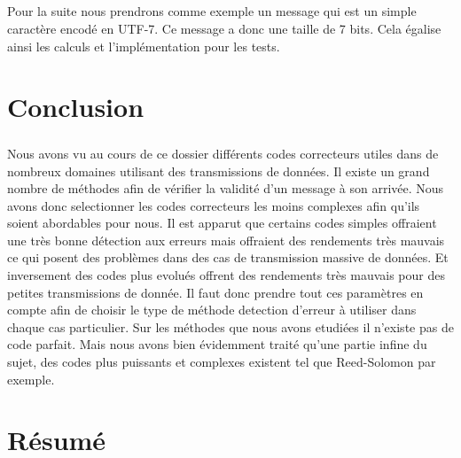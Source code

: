 \documentclass[a4paper,11pt]{report}
\begin{document}
        \paragraph{}
Pour la suite nous prendrons comme exemple un message qui est un simple caractère encodé en UTF-7.
Ce message a donc une taille de 7 bits.
Cela égalise ainsi les calculs et l'implémentation pour les tests.
    \clearpage

    
    \clearpage

    
    \clearpage

    
    \clearpage

    
    \clearpage

\chapter*{Conclusion}
        \paragraph{}
Nous avons vu au cours de ce dossier différents codes correcteurs utiles dans de nombreux domaines utilisant des transmissions de données.
Il existe un grand nombre de méthodes afin de vérifier la validité d'un message à son arrivée.
Nous avons donc selectionner les codes correcteurs les moins complexes afin qu'ils soient abordables pour nous.
Il est apparut que certains codes simples offraient une très bonne détection aux erreurs mais offraient des rendements très mauvais ce qui posent des problèmes dans des cas de transmission massive de données.
Et inversement des codes plus evolués offrent des rendements très mauvais pour des petites transmissions de donnée.
Il faut donc prendre tout ces paramètres en compte afin de choisir le type de méthode detection d'erreur à utiliser dans chaque cas particulier.
Sur les méthodes que nous avons etudiées il n'existe pas de code parfait.
Mais nous avons bien évidemment traité qu'une partie infine du sujet,
des codes plus puissants et complexes existent tel que Reed-Solomon par exemple.
    \clearpage

\chapter*{Résumé}
\end{document}
